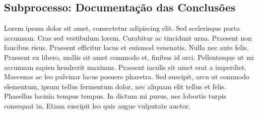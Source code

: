 \begin{apendicesenv}

\partapendices

\chapter{Subprocesso: Documentação das Conclusões}
\label{ap-documentacao-conclusoes}

Lorem ipsum dolor sit amet, consectetur adipiscing elit. Sed scelerisque porta accumsan. Cras sed vestibulum lorem. Curabitur ac tincidunt urna. Praesent non faucibus risus. Praesent efficitur lacus et euismod venenatis. Nulla nec ante felis. Praesent ex libero, mollis sit amet commodo et, finibus id orci. Pellentesque ut mi accumsan sapien hendrerit maximus. Praesent iaculis sit amet erat a imperdiet. Maecenas ac leo pulvinar lacus posuere pharetra. Sed suscipit, arcu ut commodo elementum, ipsum tellus fermentum dolor, nec aliquam elit tellus et felis. Phasellus lacinia tempus tempus. In dictum mi purus, nec lobortis turpis consequat in. Etiam suscipit leo quis augue vulputate auctor.




\end{apendicesenv}

